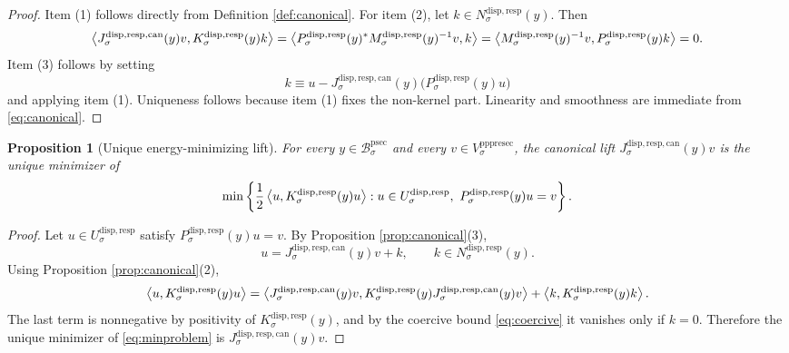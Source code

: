 \documentclass[11pt]{article}
\newcommand{\ProtoSectionBody}[1]{\mathcal B_{#1}^{\mathrm{psec}}}
\newcommand{\PrePreProtoSectionVertical}[1]{V_{#1}^{\mathrm{pppresec}}}
\newcommand{\SubstrateCarrier}[1]{U_{#1}^{\mathrm{disp,resp}}}
\newcommand{\SubstrateProjection}[1]{P_{#1}^{\mathrm{disp,resp}}}
\newcommand{\SubstrateOperator}[1]{K_{#1}^{\mathrm{disp,resp}}}
\newcommand{\SubstrateKernel}[1]{N_{#1}^{\mathrm{disp,resp}}}
\newcommand{\SchurResponse}[1]{M_{#1}^{\mathrm{disp,resp}}}
\newcommand{\CanonicalLift}[1]{J_{#1}^{\mathrm{disp,resp,can}}}
\newtheorem{proposition}{Proposition}
\begin{document}
\begin{proof}
Item (1) follows directly from Definition \ref{def:canonical}. For item (2), let \(k\in\SubstrateKernel{\sigma}(y)\). Then
\[
\ev{
\CanonicalLift{\sigma}(y)v,
\SubstrateOperator{\sigma}(y)k
}
=
\ev{
\SubstrateProjection{\sigma}(y)^*\SchurResponse{\sigma}(y)^{-1}v,
k
}
=
\ev{
\SchurResponse{\sigma}(y)^{-1}v,
\SubstrateProjection{\sigma}(y)k
}
=
0.
\]
Item (3) follows by setting
\[
k\equiv u-\CanonicalLift{\sigma}(y)\bigl(\SubstrateProjection{\sigma}(y)u\bigr)
\]
and applying item (1). Uniqueness follows because item (1) fixes the non-kernel part. Linearity and smoothness are immediate from \eqref{eq:canonical}.
\end{proof}

\begin{proposition}[Unique energy-minimizing lift]
\label{prop:min}
For every \(y\in\ProtoSectionBody{\sigma}\) and every \(v\in\PrePreProtoSectionVertical{\sigma}\), the canonical lift \(\CanonicalLift{\sigma}(y)v\) is the unique minimizer of
\begin{equation}
\min\left\{
\frac{1}{2}\ev{u,\SubstrateOperator{\sigma}(y)u}:
u\in\SubstrateCarrier{\sigma},
\ \SubstrateProjection{\sigma}(y)u=v
\right\}.
\label{eq:minproblem}
\end{equation}
\end{proposition}

\begin{proof}
Let \(u\in\SubstrateCarrier{\sigma}\) satisfy \(\SubstrateProjection{\sigma}(y)u=v\). By Proposition \ref{prop:canonical}(3),
\[
u=\CanonicalLift{\sigma}(y)v+k,
\qquad
k\in\SubstrateKernel{\sigma}(y).
\]
Using Proposition \ref{prop:canonical}(2),
\[
\ev{u,\SubstrateOperator{\sigma}(y)u}
=
\ev{
\CanonicalLift{\sigma}(y)v,
\SubstrateOperator{\sigma}(y)\CanonicalLift{\sigma}(y)v
}
+
\ev{k,\SubstrateOperator{\sigma}(y)k}.
\]
The last term is nonnegative by positivity of \(\SubstrateOperator{\sigma}(y)\), and by the coercive bound \eqref{eq:coercive} it vanishes only if \(k=0\). Therefore the unique minimizer of \eqref{eq:minproblem} is \(\CanonicalLift{\sigma}(y)v\).
\end{proof}
\end{document}
